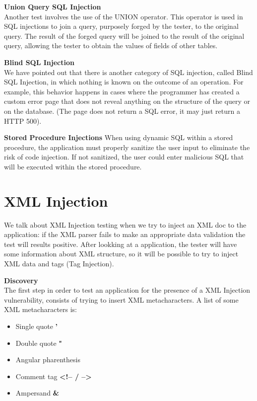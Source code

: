 	{\bf Union Query SQL Injection} \\
	Another test involves the use of the UNION operator. This operator is used in SQL injections to 
	join a query, purposely forged by the tester, to the original query. The result of the forged 
	query will be joined to the result of the original query, allowing the tester to obtain the 
	values of fields of other tables.

	{\bf Blind SQL Injection} \\
	We have pointed out that there is another category of SQL injection, called Blind SQL Injection, 
	in which nothing is known on the outcome of an operation. For example, this behavior happens in 
	cases where the programmer has created a custom error page that does not reveal anything on 
	the structure of the query or on the database. (The page does not return a SQL error, it may 
	just return a HTTP 500).

	{\bf Stored Procedure Injections}
	When using dynamic SQL within a stored procedure, the application must properly sanitize the user 
	input to eliminate the risk of code injection. If not sanitized, the user could enter malicious 
	SQL that will be executed within the stored procedure.


\section{XML Injection}
	We talk about XML Injection testing when we try to inject an XML doc to the application: if the 
	XML parser fails to make an appropriate data validation the test will results positive.
	After lookking at a application, the tester will have some information about XML structure, 
	so it will be possible to try to inject XML data and tags (Tag Injection).

	{\bf Discovery} \\
	The first step in order to test an application for the presence of a XML Injection vulnerability,
	consists of trying to insert XML metacharacters.
	A list of some XML metacharacters is:
	\begin{itemize}
		\item Single quote {\bf '}
		\item Double quote {\bf "}
		\item Angular pharenthesis {\bf < >}
		\item Comment tag {\bf <!-- / -->}
		\item Ampersand {\bf \&}
	\end{itemize}

